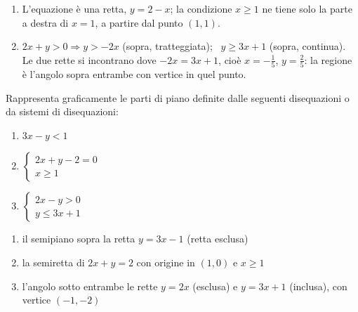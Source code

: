 \begin{question}[ID=1.1, subtitle={Rappresentazione di parti di piano — serie 1}, tags={parti di piano}, difficulty=facile]
\begin{explanation}
\begin{enumerate}
\[\begin{aligned}
    \end{aligned}\]
    Semipiano sotto la retta, tratteggiata.
    \item L'equazione è una retta, $y=2-x$; la condizione $x\geq1$ ne tiene solo la parte a destra di $x=1$, a partire dal punto $(1,1)$.
    \item $2x+y>0 \Rightarrow y>-2x$ (sopra, tratteggiata); \ $y\geq3x+1$ (sopra, continua). \\
    Le due rette si incontrano dove $-2x=3x+1$, cioè $x=-\tfrac15$, $y=\tfrac25$: la regione è l'angolo sopra entrambe con vertice in quel punto.
\end{enumerate}
\end{explanation}
\end{question}

\begin{question}[ID=1.2, subtitle={Rappresentazione di parti di piano — serie 2}, tags={parti di piano}, difficulty=facile]
Rappresenta graficamente le parti di piano definite dalle seguenti disequazioni o da sistemi di disequazioni:
\vspace{-10pt}
\begin{center}\begin{minipage}{0.7\linewidth}
\begin{enumerate}
\item $3 x - y < 1$
\item $\begin{cases} 2x + y - 2 = 0 \\ x \ge 1 \end{cases}$
\item $\begin{cases} 2x-y> 0 \\ y \le 3x+1 \end{cases}$
\end{enumerate}
\end{minipage}\end{center}
\vspace{-20pt}
\begin{solution}
\begin{enumerate}
    \item il semipiano sopra la retta $y=3x-1$ (retta esclusa)
    \item la semiretta di $2x+y=2$ con origine in $(1,0)$ e $x\geq1$
    \item l'angolo sotto entrambe le rette $y=2x$ (esclusa) e $y=3x+1$ (inclusa), con vertice $(-1,-2)$
\end{enumerate}
\end{solution}

\end{question}
